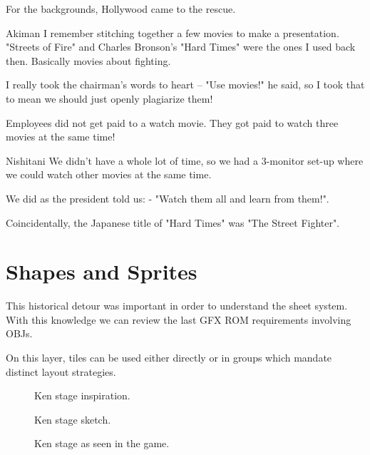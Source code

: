 
For the backgrounds, Hollywood came to the rescue.

\begin{q}{Akiman\cite{ffdevinterview}}
I remember stitching together a few movies to make a presentation. "Streets of Fire" and Charles Bronson’s "Hard Times" were the ones I used back then. Basically movies about fighting. 

I really took the chairman’s words to heart – "Use movies!" he said, so I took that to mean we should just openly plagiarize them!
\end{q}

Employees did not get paid to a watch movie. They got paid to watch three movies at the same time!

\begin{q}{Nishitani\cite{ffdevinterview}}
We didn't have a whole lot of time, so we had a 3-monitor set-up where we could watch other movies at the same time.

We did as the president told us: - "Watch them all and learn from them!".
\end{q}

\begin{trivia}
Coincidentally, the Japanese title of "Hard Times" was "The Street Fighter".
\end{trivia}


\section{Shapes and Sprites}
This historical detour was important in order to understand the sheet system. With this knowledge we can review the last GFX ROM requirements involving OBJs.  

On this layer, tiles can be used either directly or in groups which mandate distinct layout strategies.

\begin{figure}[H]
\caption*{Ken stage inspiration.}
\end{figure}

\begin{figure}[H]
\caption*{Ken stage sketch\cite{sf2completefiles}.}
\end{figure}

\begin{figure}[H]
\caption*{Ken stage as seen in the game.}
\end{figure}



